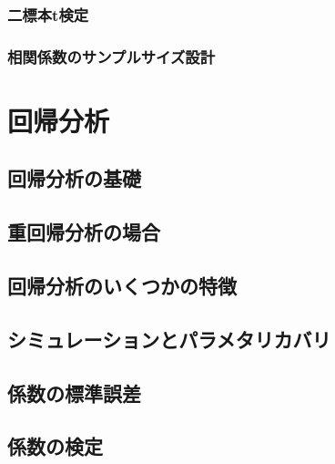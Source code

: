 \documentclass[
  a4paper,
]{ltjsbook}
\begin{document}
\subsection{二標本t検定}\label{ux4e8cux6a19ux672ctux691cux5b9a}

\subsection{相関係数のサンプルサイズ設計}\label{ux76f8ux95a2ux4fc2ux6570ux306eux30b5ux30f3ux30d7ux30ebux30b5ux30a4ux30baux8a2dux8a08}


\chapter{回帰分析}\label{ux56deux5e30ux5206ux6790}

\section{回帰分析の基礎}\label{ux56deux5e30ux5206ux6790ux306eux57faux790e}

\section{重回帰分析の場合}\label{ux91cdux56deux5e30ux5206ux6790ux306eux5834ux5408}

\section{回帰分析のいくつかの特徴}\label{ux56deux5e30ux5206ux6790ux306eux3044ux304fux3064ux304bux306eux7279ux5fb4}

\section{シミュレーションとパラメタリカバリ}\label{ux30b7ux30dfux30e5ux30ecux30fcux30b7ux30e7ux30f3ux3068ux30d1ux30e9ux30e1ux30bfux30eaux30abux30d0ux30ea}

\section{係数の標準誤差}\label{ux4fc2ux6570ux306eux6a19ux6e96ux8aa4ux5dee}

\section{係数の検定}\label{ux4fc2ux6570ux306eux691cux5b9a}
\end{document}
